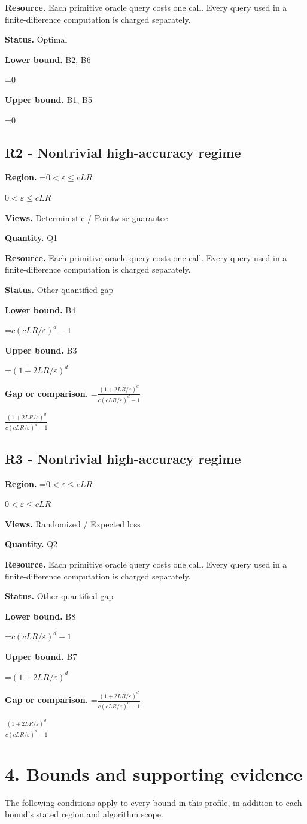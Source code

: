 \documentclass[10pt,a4paper]{article}
\newcommand{\AtlasMath}[1]{\par\begingroup\centering\setbox0=\hbox{$\displaystyle #1$}\ifdim\wd0>1.4\linewidth\typeout{ATLAS WIDE FORMULA: \the\wd0}\fi\ifdim\wd0>\linewidth\resizebox{\linewidth}{!}{\box0}\else\box0\fi\par\endgroup}
\newcommand{\AtlasInlineMath}[1]{\begingroup\setbox0=\hbox{$#1$}\ifdim\wd0>.4\linewidth\endgroup\AtlasMath{#1}\else\endgroup$#1$\fi}
\begin{document}
\textbf{Resource.} Each primitive oracle query costs one call. Every query used in a finite-difference computation is charged separately.

\textbf{Status.} Optimal

\textbf{Lower bound.} B2, B6

\AtlasMath{0}
\textbf{Upper bound.} B1, B5

\AtlasMath{0}
\subsection{R2 - Nontrivial high-accuracy regime}
\textbf{Region.} \AtlasInlineMath{0<\varepsilon\le cLR}

\textbf{Views.} Deterministic / Pointwise guarantee

\textbf{Quantity.} Q1

\textbf{Resource.} Each primitive oracle query costs one call. Every query used in a finite-difference computation is charged separately.

\textbf{Status.} Other quantified gap

\textbf{Lower bound.} B4

\AtlasMath{c(cLR/\varepsilon)^d-1}
\textbf{Upper bound.} B3

\AtlasMath{(1+2LR/\varepsilon)^d}
\textbf{Gap or comparison.} \AtlasInlineMath{\frac{(1+2LR/\varepsilon)^d}{c(cLR/\varepsilon)^d-1}}

\subsection{R3 - Nontrivial high-accuracy regime}
\textbf{Region.} \AtlasInlineMath{0<\varepsilon\le cLR}

\textbf{Views.} Randomized / Expected loss

\textbf{Quantity.} Q2

\textbf{Resource.} Each primitive oracle query costs one call. Every query used in a finite-difference computation is charged separately.

\textbf{Status.} Other quantified gap

\textbf{Lower bound.} B8

\AtlasMath{c(cLR/\varepsilon)^d-1}
\textbf{Upper bound.} B7

\AtlasMath{(1+2LR/\varepsilon)^d}
\textbf{Gap or comparison.} \AtlasInlineMath{\frac{(1+2LR/\varepsilon)^d}{c(cLR/\varepsilon)^d-1}}

\section{4. Bounds and supporting evidence}
The following conditions apply to every bound in this profile, in addition to each bound's stated region and algorithm scope.
\end{document}
